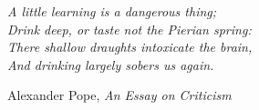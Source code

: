 %
%

\null
{}

\setlength{\epigraphwidth}{.5\textwidth}
\renewcommand{\epigraphsize}{\footnotesize}

\epigraph{
    \textit{%
        A little learning is a dangerous thing;\\
        Drink deep, or taste not the Pierian spring:\\
        There shallow draughts intoxicate the brain,\\
        And drinking largely sobers us again.
    }
}{Alexander Pope, \textit{An Essay on Criticism}}

\null
